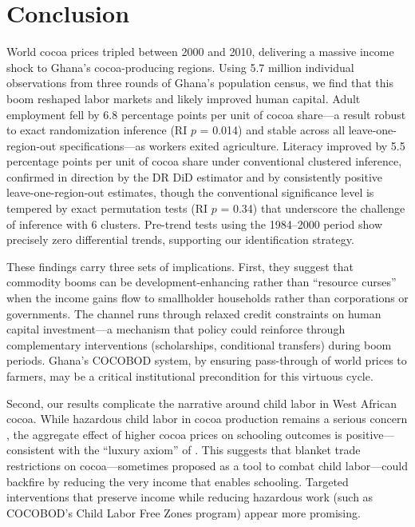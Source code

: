 \documentclass[12pt]{article}
\begin{document}
\section{Conclusion}
\label{sec:conclusion}

World cocoa prices tripled between 2000 and 2010, delivering a massive income shock to Ghana's cocoa-producing regions. Using 5.7 million individual observations from three rounds of Ghana's population census, we find that this boom reshaped labor markets and likely improved human capital. Adult employment fell by 6.8 percentage points per unit of cocoa share---a result robust to exact randomization inference (RI $p$ = 0.014) and stable across all leave-one-region-out specifications---as workers exited agriculture. Literacy improved by 5.5 percentage points per unit of cocoa share under conventional clustered inference, confirmed in direction by the DR DiD estimator and by consistently positive leave-one-region-out estimates, though the conventional significance level is tempered by exact permutation tests (RI $p$ = 0.34) that underscore the challenge of inference with 6 clusters. Pre-trend tests using the 1984--2000 period show precisely zero differential trends, supporting our identification strategy.

These findings carry three sets of implications. First, they suggest that commodity booms can be development-enhancing rather than ``resource curses'' when the income gains flow to smallholder households rather than corporations or governments. The channel runs through relaxed credit constraints on human capital investment---a mechanism that policy could reinforce through complementary interventions (scholarships, conditional transfers) during boom periods. Ghana's COCOBOD system, by ensuring pass-through of world prices to farmers, may be a critical institutional precondition for this virtuous cycle.

Second, our results complicate the narrative around child labor in West African cocoa. While hazardous child labor in cocoa production remains a serious concern \citep{ilo2020, norc2020}, the aggregate effect of higher cocoa prices on schooling outcomes is positive---consistent with the ``luxury axiom'' of \citet{basu1998}. This suggests that blanket trade restrictions on cocoa---sometimes proposed as a tool to combat child labor---could backfire by reducing the very income that enables schooling. Targeted interventions that preserve income while reducing hazardous work (such as COCOBOD's Child Labor Free Zones program) appear more promising.
\end{document}

